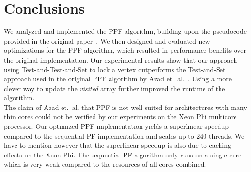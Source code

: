 \documentclass[letterpaper]{article}
\begin{document}
%

%

\section{Conclusions}

We analyzed and implemented the PPF algorithm, building upon the pseudocode provided in the original paper~\cite{Azad:2012}. We then designed and evaluated new optimizations for the PPF algorithm, which resulted in performance benefits over the original implementation. Our experimental results show that our approach using Test-and-Test-and-Set to lock a vertex outperforms the  Test-and-Set approach used in the original PPF algorithm by Azad et.\ al.\ \cite{Azad:2012}. Using a more clever way to update the \textit{visited} array further improved the runtime of the algorithm.\\

The claim of Azad et.\ al. \cite{Azad:2015} that PPF is not well suited for architectures with many thin cores could not be verified by our experiments on the Xeon Phi multicore processor. Our optimized PPF implementation yields a superlinear speedup compared to the sequential PF implementation and scales up to 240 threads. We have to mention however that the superlinear speedup is also due to caching effects on the Xeon Phi. The sequential PF algorithm only runs on a single core which is very weak compared to the resources of all cores combined.\\
\end{document}
